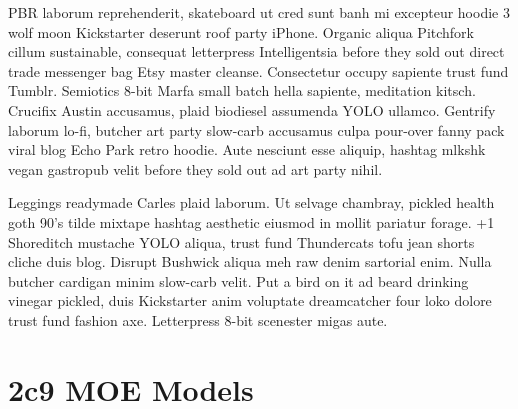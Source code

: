 PBR laborum reprehenderit, skateboard ut cred sunt banh mi excepteur hoodie 3 wolf moon Kickstarter deserunt roof party iPhone. Organic aliqua Pitchfork cillum sustainable, consequat letterpress Intelligentsia before they sold out direct trade messenger bag Etsy master cleanse. Consectetur occupy sapiente trust fund Tumblr. Semiotics 8-bit Marfa small batch hella sapiente, meditation kitsch. Crucifix Austin accusamus, plaid biodiesel assumenda YOLO ullamco. Gentrify laborum lo-fi, butcher art party slow-carb accusamus culpa pour-over fanny pack viral blog Echo Park retro hoodie. Aute nesciunt esse aliquip, hashtag mlkshk vegan gastropub velit before they sold out ad art party nihil.

Leggings readymade Carles plaid laborum. Ut selvage chambray, pickled health goth 90's tilde mixtape hashtag aesthetic eiusmod in mollit pariatur forage. +1 Shoreditch mustache YOLO aliqua, trust fund Thundercats tofu jean shorts cliche duis blog. Disrupt Bushwick aliqua meh raw denim sartorial enim. Nulla butcher cardigan minim slow-carb velit. Put a bird on it ad beard drinking vinegar pickled, duis Kickstarter anim voluptate dreamcatcher four loko dolore trust fund fashion axe. Letterpress 8-bit scenester migas aute.

\section{2c9 MOE Models}

